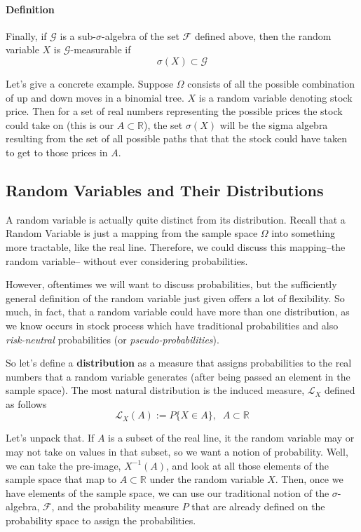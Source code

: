 \documentclass[12pt]{article}
\theoremstyle{plain}
\theoremstyle{definition}
\theoremstyle{remark}
\begin{document}
\paragraph{Definition} Finally, if $\mathcal{G}$ is a
sub-$\sigma$-algebra of the set $\mathcal{F}$ defined above, then the
random variable $X$ is $\mathcal{G}$-measurable if
   \[ \sigma(X) \subset \mathcal{G} \]

Let's give a concrete example.  Suppose $\Omega$ consists of all the
possible combination of up and down moves in a binomial tree.  $X$ is
a random variable denoting stock price.  Then for a set of real numbers
representing the possible prices the stock could take on (this is
our $A \subset \mathbb{R}$), the set $\sigma(X)$ will be the sigma
algebra resulting from the set of all possible paths that that the
stock could have taken to get to those prices in $A$.

\subsection{Random Variables and Their Distributions}

A random variable is actually quite distinct from its distribution.  Recall that a Random Variable is just a mapping from the
sample space $\Omega$ into something more tractable, like the real line.  Therefore, we could discuss this mapping--the random variable--
without ever considering probabilities.

However, oftentimes we will want to discuss probabilities, but the sufficiently general definition of the random variable just given
offers a lot of flexibility.  So much, in fact, that a random variable could have more than one distribution, as we know occurs in
stock process which have traditional probabilities and also \emph{risk-neutral} probabilities (or \emph{pseudo-probabilities}).

So let's define a \textbf{distribution} as a measure that assigns probabilities to the real numbers that a random variable generates
(after being passed an element in the sample space).  The most natural distribution is the induced measure, $\mathcal{L}_X$ defined
as follows
\[ \mathcal{L}_X(A) := P \{ X \in A \}, \;\; A \subset \mathbb{R} \]

Let's unpack that. If $A$ is a subset of the real line, it the random variable may or may not take on values in that subset, so we want
a notion of probability.  Well, we can take the pre-image, $X^{-1}(A)$, and look at all those elements of the sample space that map to
$A \subset \mathbb{R}$ under the random variable $X$.  Then, once we have elements of the sample space, we can use our traditional notion
of the $\sigma$-algebra, $\mathcal{F}$, and the probability measure $P$ that are already defined on the probability space to assign
the probabilities.
\end{document}
